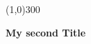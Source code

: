 \documentclass{article}
\begin{document}
\begin{titlepage}
	\begin{center}

	\line(1,0){300}

	\huge{\bfseries My second Title}

	\end{center}
\end{titlepage}
\end{document}
